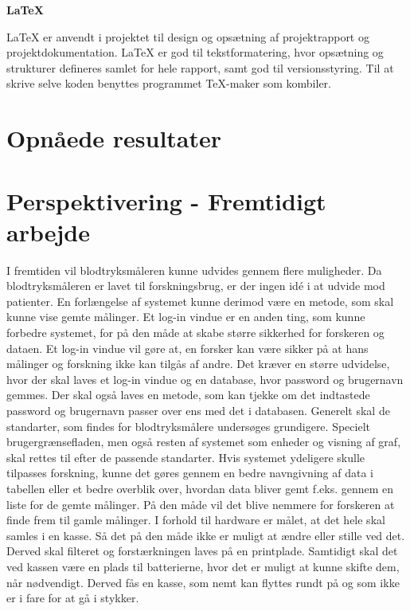 \textbf{LaTeX}

LaTeX er anvendt i projektet til design og opsætning af projektrapport og projektdokumentation. LaTeX er god til tekstformatering, hvor opsætning og strukturer defineres samlet for hele rapport, samt god til versionsstyring. Til at skrive selve koden benyttes programmet TeX-maker som kombiler. 

\section{Opnåede resultater}
\section{Perspektivering - Fremtidigt arbejde}
I fremtiden vil blodtryksmåleren kunne udvides gennem flere muligheder. Da blodtryksmåleren er lavet til forskningsbrug, er der ingen idé i at udvide mod patienter.  En forlængelse af systemet kunne derimod være en metode, som skal kunne vise gemte målinger. \newline Et log-in vindue er en anden ting, som kunne forbedre systemet, for på den måde at skabe større sikkerhed for forskeren og dataen. Et log-in vindue vil gøre at, en forsker kan være sikker på at hans målinger og forskning ikke kan tilgås af andre. Det kræver en større udvidelse, hvor der skal laves et log-in vindue og en database, hvor password og brugernavn gemmes. Der skal også laves en metode, som kan tjekke om det indtastede password og brugernavn passer over ens med det i databasen. 
\newline
Generelt skal de standarter, som findes for blodtryksmålere undersøges grundigere. Specielt brugergrænsefladen, men også resten af systemet som enheder og visning af graf, skal rettes til efter de passende standarter.
\newline 
Hvis systemet ydeligere skulle tilpasses forskning, kunne det gøres gennem en bedre navngivning af data i tabellen eller et bedre overblik over, hvordan data bliver gemt f.eks. gennem en liste for de gemte målinger. På den måde vil det blive nemmere for forskeren at finde frem til gamle målinger.   
\newline 
I forhold til hardware er målet, at det hele skal samles i en kasse. Så det på den måde ikke er muligt at ændre eller stille ved det. Derved skal filteret og forstærkningen laves på en printplade. Samtidigt skal det ved kassen være en plads til batterierne, hvor det er muligt at kunne skifte dem, når nødvendigt. Derved fås en kasse, som nemt kan flyttes rundt på og som ikke er i fare for at gå i stykker.   
